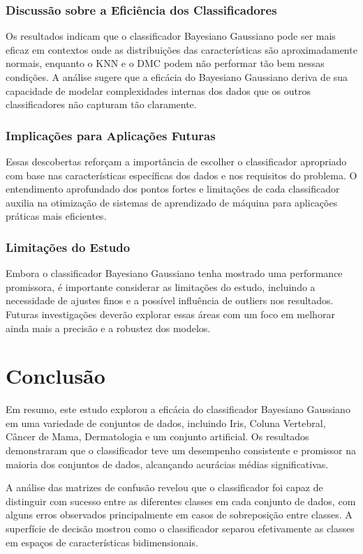 \documentclass[12pt, a4paper]{report}
\begin{document}
\subsection{Discussão sobre a Eficiência dos Classificadores}
Os resultados indicam que o classificador Bayesiano Gaussiano pode ser mais eficaz em contextos onde as distribuições das características são aproximadamente normais, enquanto o KNN e o DMC podem não performar tão bem nessas condições. A análise sugere que a eficácia do Bayesiano Gaussiano deriva de sua capacidade de modelar complexidades internas dos dados que os outros classificadores não capturam tão claramente.


\subsection{Implicações para Aplicações Futuras}
Essas descobertas reforçam a importância de escolher o classificador apropriado com base nas características específicas dos dados e nos requisitos do problema. O entendimento aprofundado dos pontos fortes e limitações de cada classificador auxilia na otimização de sistemas de aprendizado de máquina para aplicações práticas mais eficientes.


\subsection{Limitações do Estudo}
Embora o classificador Bayesiano Gaussiano tenha mostrado uma performance promissora, é importante considerar as limitações do estudo, incluindo a necessidade de ajustes finos e a possível influência de outliers nos resultados. Futuras investigações deverão explorar essas áreas com um foco em melhorar ainda mais a precisão e a robustez dos modelos.


\chapter{Conclusão}

Em resumo, este estudo explorou a eficácia do classificador Bayesiano Gaussiano em uma variedade de conjuntos de dados, incluindo Iris, Coluna Vertebral, Câncer de Mama, Dermatologia e um conjunto artificial. Os resultados demonstraram que o classificador teve um desempenho consistente e promissor na maioria dos conjuntos de dados, alcançando acurácias médias significativas.

A análise das matrizes de confusão revelou que o classificador foi capaz de distinguir com sucesso entre as diferentes classes em cada conjunto de dados, com alguns erros observados principalmente em casos de sobreposição entre classes. A superfície de decisão mostrou como o classificador separou efetivamente as classes em espaços de características bidimensionais.
\end{document}

